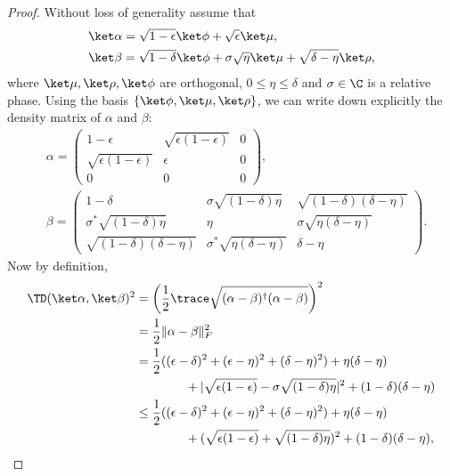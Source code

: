 \begin{proof}
Without loss of generality assume that
\begin{align}
    &\ket\alpha = \sqrt{1-\epsilon}\ket\phi + \sqrt\epsilon \ket \mu, 
    \nonumber\\
    &\ket\beta = \sqrt{1-\delta}\ket\phi + \sigma\sqrt\eta\ket\mu + \sqrt{\delta-\eta}\ket\rho,
    \nonumber
\end{align}
where $\ket\mu, \ket\rho, \ket\phi$ are orthogonal, $0\le\eta\le \delta$ and $\sigma\in \C$ is a relative phase. Using the basis $\{\ket\phi, \ket\mu, \ket\rho\}$, we can write down explicitly the density matrix of $\alpha$ and $\beta$:
\begin{align*}
&\alpha = \begin{pmatrix}
    1-\epsilon & \sqrt{\epsilon(1-\epsilon)} & 0 \\
    \sqrt{\epsilon(1-\epsilon)} & \epsilon & 0\\
    0 & 0&0
\end{pmatrix},
%
\\
&\beta = \begin{pmatrix}
    1-\delta   &   \sigma\sqrt{(1-\delta)\eta}  &  
 \sqrt{(1-\delta)(\delta-\eta)} \\
    \sigma^* \sqrt{(1-\delta)\eta} &   \eta    &   \sigma\sqrt{\eta(\delta-\eta)}\\
    \sqrt{(1-\delta)(\delta-\eta)} &   \sigma^*\sqrt{\eta(\delta-\eta)} & \delta-\eta
\end{pmatrix}.
\end{align*}
Now by definition, 
\begin{align}
    \TD(\ket\alpha, \ket\beta) ^2
    &= \left(\frac{1}{2}\trace\sqrt{(\alpha - \beta)^\dagger (\alpha-\beta)}\right)^2
       \nonumber \\
    &= \frac{1}{2} \|\alpha-\beta\|_F^2
        \nonumber\\
    &= \frac{1}{2}( (\epsilon-\delta)^2 + (\epsilon-\eta)^2 + (\delta-\eta)^2 )
        +\eta(\delta-\eta) 
        \nonumber \\
    &\qquad\qquad + |\sqrt{\epsilon(1-\epsilon)}-\sigma\sqrt{(1-\delta)\eta}|^2 +(1-\delta)(\delta-\eta) 
        \nonumber\\
    &\le \frac{1}{2}( (\epsilon-\delta)^2 + (\epsilon-\eta)^2 + (\delta-\eta)^2 )
        +\eta(\delta-\eta) 
        \nonumber \\
    &\qquad\qquad + (\sqrt{\epsilon(1-\epsilon)}+\sqrt{(1-\delta)\eta})^2 +(1-\delta)(\delta-\eta), \label{eq:trace-triangle-bound}
\end{align}

\end{proof}
